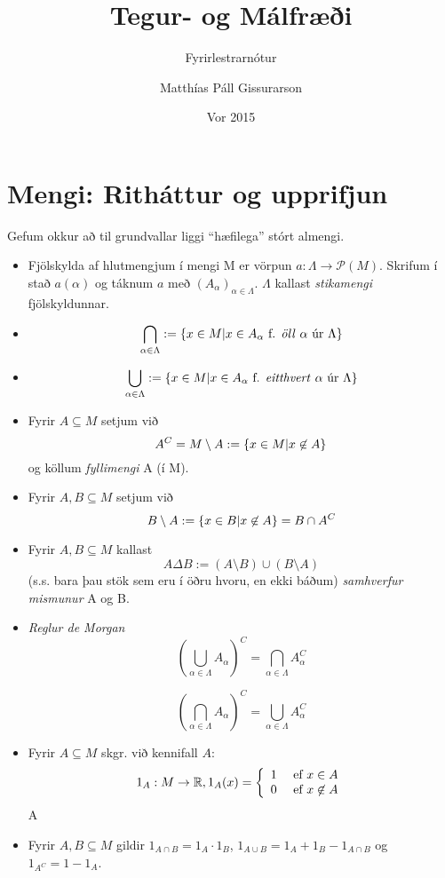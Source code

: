 \documentclass[12pt]{book}
\title{Tegur- og Málfræði}
\subtitle{Fyrirlestrarnótur}
\author{Matthías Páll Gissurarson}
\date{Vor 2015}
\begin{document}
\maketitle

\tableofcontents

\section{Mengi: Ritháttur og upprifjun}
Gefum okkur að til grundvallar liggi ``hæfilega''  stórt almengi.

\begin{itemize}
\item Fjölskylda af hlutmengjum í mengi M er vörpun \(a: \Lambda \to \mathcal{P}(M) \). Skrifum í stað $a(\alpha)$ og táknum $a$ með $(A_{\alpha})_{\alpha \in \Lambda}$. $\Lambda$ kallast \emph{stikamengi} fjölskyldunnar.
\item \[ \bigcap_{\alpha \in \Lambda} := \{x \in M | x \in A_{\alpha} \text{ f. \emph{öll} $\alpha$ úr $\Lambda$}\}\]
\item \[ \bigcup_{\alpha \in \Lambda} := \{x \in M | x \in A_{\alpha} \text{ f. \emph{eitthvert} $\alpha$ úr $\Lambda$}\}\]

\item Fyrir $A \subseteq M$ setjum við \[A^C = M \setminus A := \{ x \in M | x \not\in A\}\] og köllum \emph{fyllimengi} A (í M).
\item Fyrir $ A, B \subseteq M$ setjum við \[B \setminus A := \{ x \in B | x \not\in A\} = B \cap A^C\]
\item Fyrir $A,B \subseteq M$ kallast \[ A \Delta B := ( A \setminus B) \cup (B \setminus A) \] (s.s. bara þau stök sem eru í öðru hvoru, en ekki báðum) \emph{samhverfur mismunur} A og B.

\item \emph{Reglur de Morgan} \[ (\bigcup_{\alpha \in \Lambda} A_{\alpha})^C = \bigcap_{\alpha \in \Lambda} A_{\alpha}^C\]

\[ (\bigcap_{\alpha \in \Lambda} A_{\alpha})^C = \bigcup_{\alpha \in \Lambda} A_{\alpha}^C\]
\item Fyrir $ A \subseteq M$ skgr. við kennifall $A$:
\[ 1_A: M \to \mathbb{R}, 1_A(x) = \left\{ \begin{array}{l l} 1 & \text{ ef } x \in A \\ 0 & \text{ ef } x \not\in A \end{array} \right. \]A

\item Fyrir $A,B \subseteq M$ gildir $1_{A \cap B} = 1_A \cdot 1_B$, $1_{A \cup B} = 1_A + 1_B - 1_{A \cap B}$ og $1_{A^C} = 1 - 1_A$.
\end{itemize}
\end{document}
